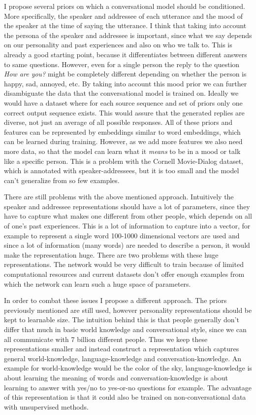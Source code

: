\documentclass[12pt]{article}
\begin{document}
I propose several priors on which a conversational model should be conditioned. More specifically, the speaker and addressee of each utterance and the mood of the speaker at the time of saying the utterance. I think that taking into account the persona of the speaker and addressee is important, since what we say depends on our personality and past experiences and also on who we talk to. This is already a good starting point, because it differentiates between different answers to same questions. However, even for a single person the reply to the question \textit{How are you?} might be completely different depending on whether the person is happy, sad, annoyed, etc. By taking into account this mood prior we can further disambiguate the data that the conversational model is trained on. Ideally we would have a dataset where for each source sequence and set of priors only one correct output sequence exists. This would assure that the generated replies are diverse, not just an average of all possible responses. All of these priors and features can be represented by embeddings similar to word embeddings, which can be learned during training. However, as we add more features we also need more data, so that the model can learn what it \textit{means} to be in a mood or talk like a specific person. This is a problem with the Cornell Movie-Dialog dataset, which is annotated with speaker-addressees, but it is too small and the model can't generalize from so few examples. 

There are still problems with the above mentioned approach. Intuitively the speaker and addressee representations should have a lot of parameters, since they have to capture what makes one different from other people, which depends on all of one's past experiences. This is a lot of information to capture into a vector, for example to represent a single word 100-1000 dimensional vectors are used and since a lot of information (many words) are needed to describe a person, it would make the representation huge. There are two problems with these huge representations. The network would be very difficult to train because of limited computational resources and current datasets don't offer enough examples from which the network can learn such a huge space of parameters.

In order to combat these issues I propose a different approach. The priors previously mentioned are still used, however personality representations should be kept to learnable size. The intuition behind this is that people generally don't differ that much in basic world knowledge and conversational style, since we can all communicate with 7 billion different people. Thus we keep these representations smaller and instead construct a representation which captures general world-knowledge, language-knowledge and conversation-knowledge. An example for world-knowledge would be the color of the sky, language-knowledge is about learning the meaning of words and conversation-knowledge is about learning to answer with yes/no to yes-or-no questions for example. The advantage of this representation is that it could also be trained on non-conversational data with unsupervised methods.
\end{document}
